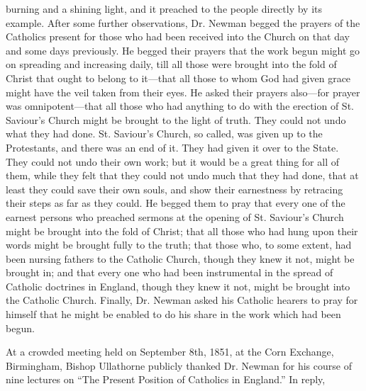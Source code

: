 burning and a shining light, and it preached to the people directly by
its example. After some further observations, Dr. Newman begged the
prayers of the Catholics present for those who had been received into
the Church on that day and some days previously. He begged their
prayers that the work begun might go on spreading and increasing
daily, till all those were brought into the fold of Christ that ought
to belong to it—that all those to whom God had given grace might
have the veil taken from their eyes. He asked their prayers also—for
prayer was omnipotent—that all those who had anything to do with the
erection of St. Saviour's Church might be brought to the light of
truth. They could not undo what they had done. St. Saviour's Church,
so called, was given up to the Protestants, and there was an end of
it. They had given it over to the State. They could not undo their own
work; but it would be a great thing for all of them, while they felt
that they could not undo much that they had done, that at least they
could save their own souls, and show their earnestness by retracing
their steps as far as they could. He begged them to pray that every
one of the earnest persons who preached sermons at the opening of St.
Saviour's Church might be brought into the fold of Christ; that all
those who had hung upon their words might be brought fully to the
truth; that those who, to some extent, had been nursing fathers to the
Catholic Church, though they knew it not, might be brought in; and
that every one who had been instrumental in the spread of Catholic
doctrines in England, though they knew it not, might be brought into
the Catholic Church. Finally, Dr. Newman asked his Catholic hearers to
pray for himself that he might be enabled to do his share in the work
which had been begun.


At a crowded meeting held on September 8th, 1851,
at the Corn Exchange, Birmingham, Bishop Ullathorne publicly thanked
Dr. Newman for his course of nine lectures on ``The Present Position of
Catholics in England.'' In reply,


